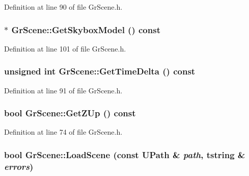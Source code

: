 Definition at line 90 of file GrScene.h.\hypertarget{class_gr_scene_b6bba978374af9a4e07fc144d7aaee4d}{
\subsubsection[{GetSkyboxModel}]{$\ast$ GrScene::GetSkyboxModel () const}}
\label{class_gr_scene_b6bba978374af9a4e07fc144d7aaee4d}




Definition at line 101 of file GrScene.h.\hypertarget{class_gr_scene_6b41fa1f794c9c955beff22da3f2e948}{
\subsubsection[{GetTimeDelta}]{\setlength{\rightskip}{0pt plus 5cm}unsigned int GrScene::GetTimeDelta () const}}
\label{class_gr_scene_6b41fa1f794c9c955beff22da3f2e948}




Definition at line 91 of file GrScene.h.\hypertarget{class_gr_scene_d7926eb0813b3d6802b735a8c9a7880f}{
\subsubsection[{GetZUp}]{\setlength{\rightskip}{0pt plus 5cm}bool GrScene::GetZUp () const}}
\label{class_gr_scene_d7926eb0813b3d6802b735a8c9a7880f}




Definition at line 74 of file GrScene.h.\hypertarget{class_gr_scene_dba42ed71a18bab46a9c02aefb6c5b36}{
\subsubsection[{LoadScene}]{\setlength{\rightskip}{0pt plus 5cm}bool GrScene::LoadScene (const {\bf UPath} \& {\em path}, \/  {\bf tstring} \& {\em errors})}}
\label{class_gr_scene_dba42ed71a18bab46a9c02aefb6c5b36}




